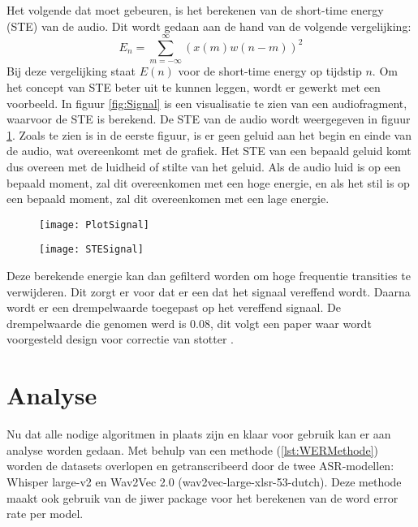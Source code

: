 Het volgende dat moet gebeuren, is het berekenen van de short-time energy (STE) van de audio. Dit wordt gedaan aan de hand van de volgende vergelijking:
    \[E_n = \sum_{m=-\infty}^{\infty} (x(m) w(n-m))^2 \]
Bij deze vergelijking staat $E(n)$ voor de short-time energy op tijdstip $n$. Om het concept van STE beter uit te kunnen leggen, wordt er gewerkt met een voorbeeld. In figuur \ref{fig:Signal} is een visualisatie te zien van een audiofragment, waarvoor de STE is berekend. De STE van de audio wordt weergegeven in figuur \ref{fig:STE}. Zoals te zien is in de eerste figuur, is er geen geluid aan het begin en einde van de audio, wat overeenkomt met de grafiek. Het STE van een bepaald geluid komt dus overeen met de luidheid of stilte van het geluid. Als de audio luid is op een bepaald moment, zal dit overeenkomen met een hoge energie, en als het stil is op een bepaald moment, zal dit overeenkomen met een lage energie.
\begin{figure}[H]
    \centering
    \begin{minipage}{.5\textwidth}
        \centering
        \texttt{[image: PlotSignal]}
        \label{fig:Signal}
    \end{minipage}%
    \begin{minipage}{.5\textwidth}
        \centering
        \texttt{[image: STESignal]}
        \label{fig:STE}
    \end{minipage}
\end{figure}
Deze berekende energie kan dan gefilterd worden om hoge frequentie transities te verwijderen. Dit zorgt er voor dat er een dat het signaal vereffend wordt. Daarna wordt er een drempelwaarde toegepast op het vereffend signaal. De drempelwaarde die genomen werd is 0.08, dit volgt een paper waar wordt voorgesteld design voor correctie van stotter .
\section{Analyse}
Nu dat alle nodige algoritmen in plaats zijn en klaar voor gebruik kan er aan analyse worden gedaan. Met behulp van een methode (\ref{lst:WERMethode}) worden de datasets overlopen en getranscribeerd door de twee ASR-modellen: Whisper large-v2 en Wav2Vec 2.0 (wav2vec-large-xlsr-53-dutch). Deze methode maakt ook gebruik van de jiwer package voor het berekenen van de word error rate per model.\\

